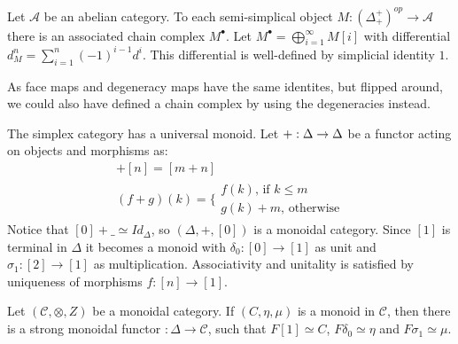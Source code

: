 \documentclass[../thesis.tex]{subfiles}
\begin{document}
            Let $\mathcal{A}$ be an abelian category. To each semi-simplical object $M:(\Delta^+_+)^{op}\rightarrow \mathcal{A}$ there is an associated chain complex $M^\bullet$. Let $M^\bullet = \bigoplus_{i=1}^\infty M[i]$ with differential $d_M^n = \sum_{i=1}^n (-1)^{i-1}d^i$. This differential is well-defined by simplicial identity $1$.
            \begin{center}
            \end{center}
            As face maps and degeneracy maps have the same identites, but flipped around, we could also have defined a chain complex by using the degeneracies instead.

            The simplex category has a universal monoid. Let $+:\Delta\time\Delta\rightarrow\Delta$ be a functor acting on objects and morphisms as:
            \begin{align*}
                [m]+[n] = [m+n] \\
                (f+g)(k) = \biggl\{\substack{f(k)\text{, if }k\leq m \\ g(k)+m\text{, otherwise}}
            \end{align*}
            Notice that $[0]+\_\simeq Id_\Delta$, so $(\Delta, +, [0])$ is a monoidal category. Since $[1]$ is terminal in $\Delta$ it becomes a monoid with $\delta_0: [0]\rightarrow [1]$ as unit and $\sigma_1:[2]\rightarrow [1]$ as multiplication. Associativity and unitality is satisfied by uniqueness of morphisms $f:[n]\rightarrow [1]$.
            \begin{proposition}\label{prop: universal-monoid}
                Let $(\mathcal{C}, \otimes, Z)$ be a monoidal category. If $(C, \eta, \mu)$ is a monoid in $\mathcal{C}$, then there is a strong monoidal functor $:\Delta\rightarrow \mathcal{C}$, such that $F[1] \simeq C$, $F\delta_0 \simeq \eta$ and $F\sigma_1 \simeq \mu$.
            \end{proposition} 

\end{document}
